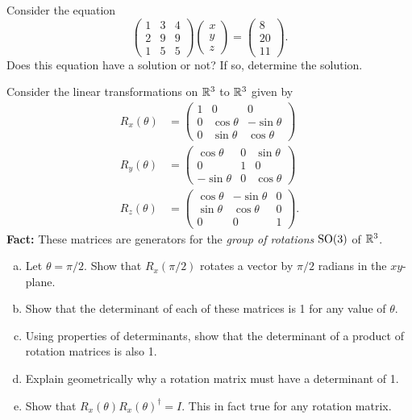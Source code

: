 \documentclass[12pt]{article} %
\begin{document}
\begin{problem}
Consider the equation
\[
\begin{pmatrix} 1 & 3 & 4 \\ 2 & 9 & 9 \\ 1 & 5 & 5 \end{pmatrix} \begin{pmatrix} x \\ y \\ z \end{pmatrix} = \begin{pmatrix} 8 \\ 20 \\ 11 \end{pmatrix}.
\]
Does this equation have a solution or not? If so, determine the solution.
\end{problem}

\begin{problem}
Consider the linear transformations on $\mathbb{R}^3$ to $\mathbb{R}^3$ given by
\begin{align*}
    R_x(\theta) &= \begin{pmatrix} 1 & 0 & 0 \\ 0 & \cos\theta & -\sin \theta \\ 0 & \sin\theta & \cos \theta \end{pmatrix}\\
    R_y(\theta) &= \begin{pmatrix} \cos \theta & 0 & \sin \theta \\ 0 & 1 & 0 \\ -\sin \theta & 0 & \cos \theta \end{pmatrix}\\
    R_z(\theta) &= \begin{pmatrix} \cos \theta & -\sin \theta & 0 \\ \sin \theta & \cos \theta  & 0 \\ 0 & 0 & 1 \end{pmatrix}.
\end{align*}
\textbf{Fact:} These matrices are generators for the \emph{group of rotations} $\mathrm{SO}(3)$ of $\mathbb{R}^3$.
\begin{enumerate}[(a)]
    \item Let $\theta = \pi/2$. Show that $R_x(\pi/2)$ rotates a vector by $\pi/2$ radians in the $xy$-plane.
    \item Show that the determinant of each of these matrices is 1 for any value of $\theta$.
    \item Using properties of determinants, show that the determinant of a product of rotation matrices is also 1.
    \item Explain geometrically why a rotation matrix must have a determinant of 1.
    \item Show that $R_x(\theta)R_x(\theta)^\dagger = I$. This in fact true for any rotation matrix.
\end{enumerate}
\end{problem}
\end{document}
